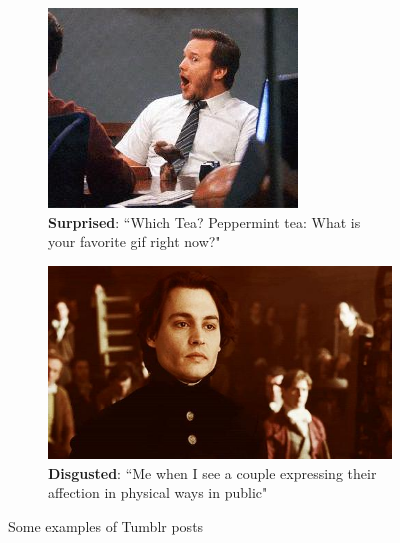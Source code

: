 \begin{figure}
\begin{subfigure}[t]{.5\textwidth}
  \includegraphics[width=.8\linewidth]{Images/surprised.jpg}
  \caption{\textbf{Surprised}: ``Which Tea? Peppermint tea: What is your favorite gif right now?"}
\end{subfigure}
\begin{subfigure}[t]{.5\textwidth}
  \vskip 0pt 
  \centering
  \includegraphics[width=.8\linewidth]{Images/disgusted.jpg}
  \caption{\textbf{Disgusted}: ``Me when I see a couple expressing their affection in physical ways in public"}
\end{subfigure}
\caption{Some examples of Tumblr posts}
\end{figure}